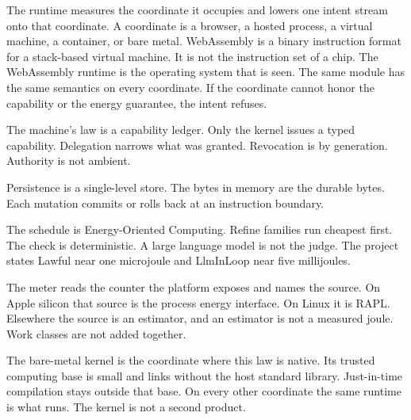 \documentclass[10pt,letterpaper]{article}
\begin{document}
The runtime measures the coordinate it occupies and lowers one intent
stream onto that coordinate. A coordinate is a browser, a hosted
process, a virtual machine, a container, or bare metal. WebAssembly is a
binary instruction format for a stack-based virtual machine. It is not
the instruction set of a chip. The WebAssembly runtime is the operating
system that is seen. The same module has the same semantics on every
coordinate. If the coordinate cannot honor the capability or the energy
guarantee, the intent refuses.

The machine's law is a capability ledger. Only the kernel issues a typed
capability. Delegation narrows what was granted. Revocation is by
generation. Authority is not ambient.

Persistence is a single-level store. The bytes in memory are the durable
bytes. Each mutation commits or rolls back at an instruction boundary.

The schedule is Energy-Oriented Computing. Refine families run cheapest
first. The check is deterministic. A large language model is not the
judge. The project states Lawful near one microjoule and LlmInLoop near
five millijoules.

The meter reads the counter the platform exposes and names the source.
On Apple silicon that source is the process energy interface. On Linux
it is RAPL. Elsewhere the source is an estimator, and an estimator is
not a measured joule. Work classes are not added together.

The bare-metal kernel is the coordinate where this law is native. Its
trusted computing base is small and links without the host standard
library. Just-in-time compilation stays outside that base. On every
other coordinate the same runtime is what runs. The kernel is not a
second product.
\end{document}
